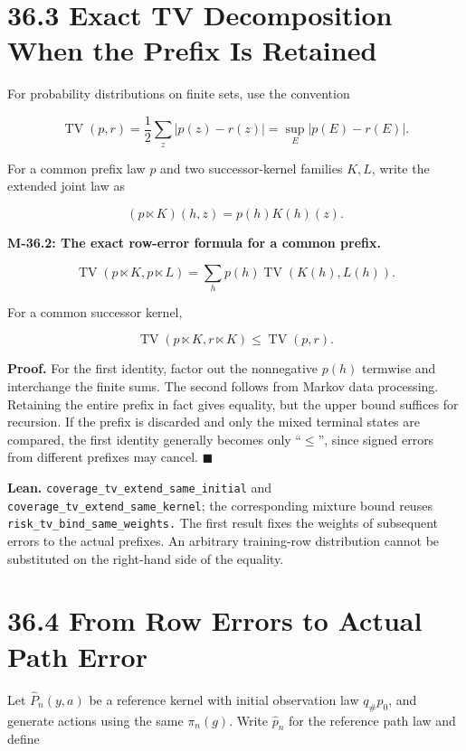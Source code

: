 \documentclass[
  english,
  11pt,
  oneside]{book}
\begin{document}
\section{36.3 Exact TV Decomposition When the Prefix Is Retained}\label{exact-tv-decomposition-when-the-prefix-is-retained}

For probability distributions on finite sets, use the convention

\[\operatorname{TV}(p,r)=\frac12\sum_z|p(z)-r(z)|
=\sup_E|p(E)-r(E)|.\]

For a common prefix law \(p\) and two successor-kernel families \(K,L\), write the extended joint law as

\[(p\ltimes K)(h,z)=p(h)K(h)(z).\]

\hypertarget{m-36-2}{}\label{m-36-2}

\textbf{M-36.2: The exact row-error formula for a common prefix.}

\[\operatorname{TV}(p\ltimes K,p\ltimes L)
=\sum_h p(h)\operatorname{TV}(K(h),L(h)).\]

For a common successor kernel,

\[\operatorname{TV}(p\ltimes K,r\ltimes K)\le\operatorname{TV}(p,r).\]

\textbf{Proof.} For the first identity, factor out the nonnegative \(p(h)\) termwise and interchange the finite sums. The second follows from Markov data processing. Retaining the entire prefix in fact gives equality, but the upper bound suffices for recursion. If the prefix is discarded and only the mixed terminal states are compared, the first identity generally becomes only ``\(\le\)'', since signed errors from different prefixes may cancel. \(\blacksquare\)

\textbf{Lean.} \nolinkurl{coverage_tv_extend_same_initial} and \nolinkurl{coverage_tv_extend_same_kernel}; the corresponding mixture bound reuses \nolinkurl{risk_tv_bind_same_weights.} The first result fixes the weights of subsequent errors to the actual prefixes. An arbitrary training-row distribution cannot be substituted on the right-hand side of the equality.

\section{36.4 From Row Errors to Actual Path Error}\label{from-row-errors-to-actual-path-error}

Let \(\widehat P_n(y,a)\) be a reference kernel with initial observation law \(q_\#p_0\), and generate actions using the same \(\pi_n(g)\). Write \(\widehat p_n\) for the reference path law and define
\end{document}
